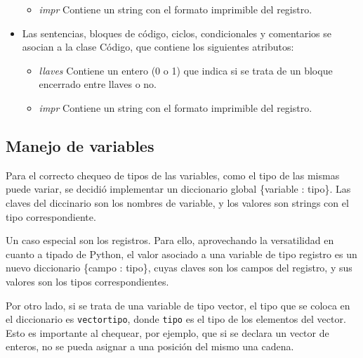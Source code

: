 \begin{itemize}
\begin{itemize}
	\item {\it impr} Contiene un string con el formato imprimible del registro.
	\end{itemize}
\item Las sentencias, bloques de código, ciclos, condicionales y comentarios se asocian a la clase Código, que contiene los siguientes atributos:
	\begin{itemize}
	\item {\it llaves} Contiene un entero (0 o 1) que indica si se trata de un bloque encerrado entre llaves o no.
	\item {\it impr} Contiene un string con el formato imprimible del registro.
	\end{itemize}
\end{itemize}


\subsection{Manejo de variables}

Para el correcto chequeo de tipos de las variables, como el tipo de las mismas puede variar, se decidió implementar un diccionario global \{variable : tipo\}.  Las claves del diccinario son los nombres de variable, y los valores son strings con el tipo correspondiente.

Un caso especial son los registros.  Para ello, aprovechando la versatilidad en cuanto a tipado de Python, el valor asociado a una variable de tipo registro es un nuevo diccionario \{campo : tipo\}, cuyas claves son los campos del registro, y sus valores son los tipos correspondientes.

Por otro lado, si se trata de una variable de tipo vector, el tipo que se coloca en el diccionario es {\tt vectortipo}, donde {\tt tipo} es el tipo de los elementos del vector.  Esto es importante al chequear, por ejemplo, que si se declara un vector de enteros, no se pueda asignar a una posición del mismo una cadena.

